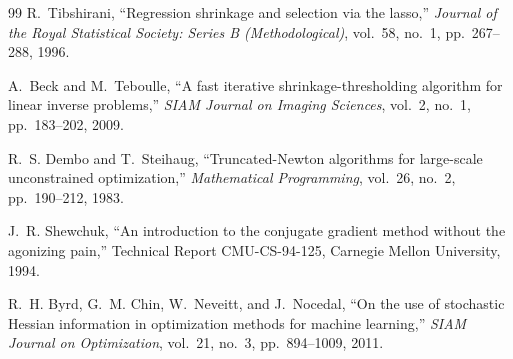 \begin{thebibliography}{99}
R.~Tibshirani,
``Regression shrinkage and selection via the lasso,''
\textit{Journal of the Royal Statistical Society: Series B (Methodological)},
vol.~58, no.~1, pp.~267--288, 1996.

A.~Beck and M.~Teboulle,
``A fast iterative shrinkage-thresholding algorithm for linear inverse
problems,''
\textit{SIAM Journal on Imaging Sciences}, vol.~2, no.~1, pp.~183--202,
2009.

R.~S. Dembo and T.~Steihaug,
``Truncated-Newton algorithms for large-scale unconstrained optimization,''
\textit{Mathematical Programming}, vol.~26, no.~2, pp.~190--212, 1983.

J.~R. Shewchuk,
``An introduction to the conjugate gradient method without the agonizing
pain,''
Technical Report CMU-CS-94-125, Carnegie Mellon University, 1994.

R.~H. Byrd, G.~M. Chin, W.~Neveitt, and J.~Nocedal,
``On the use of stochastic Hessian information in optimization methods for
machine learning,''
\textit{SIAM Journal on Optimization}, vol.~21, no.~3, pp.~894--1009, 2011.

\end{thebibliography}

